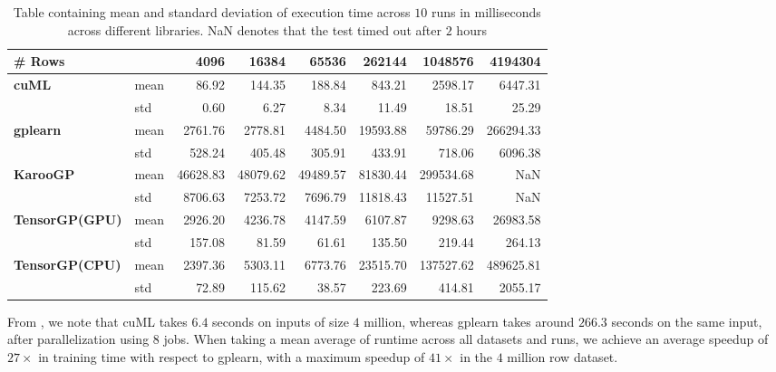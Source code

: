 \begin{table}[htbp]
  \caption{Table containing mean and standard deviation of execution time across $10$ runs in milliseconds across different libraries. NaN denotes that the test timed out after $2$ hours}
  \begin{adjustbox}{width=\columnwidth,center}
    \begin{tabular}{llrrrrrr}
      \toprule
      \textbf{\# Rows} & {} &  4096 & 16384 & 65536 & 262144 & 1048576 & 4194304 \\
      \midrule
      \textbf{cuML} & mean &    86.92 &   144.35 &   188.84 &    843.21 &    2598.17 &    6447.31 \\
      & std &     0.60 &     6.27 &     8.34 &     11.49 &      18.51 &      25.29 \\
      \midrule
      \textbf{gplearn} & mean &  2761.76 &  2778.81 &  4484.50 &  19593.88 &   59786.29 &  266294.33 \\
      & std &   528.24 &   405.48 &   305.91 &    433.91 &     718.06 &    6096.38 \\
      \midrule
      \textbf{KarooGP} & mean & 46628.83 & 48079.62 & 49489.57 &  81830.44 &  299534.68 &        NaN \\
      & std &  8706.63 &  7253.72 &  7696.79 &  11818.43 &   11527.51 &        NaN \\
      \midrule
      \textbf{TensorGP(GPU)} & mean &  2926.20 &  4236.78 &  4147.59 &   6107.87 &    9298.63 &   26983.58 \\
      & std &   157.08 &    81.59 &    61.61 &    135.50 &     219.44 &     264.13 \\
      \midrule
      \textbf{TensorGP(CPU)} & mean &  2397.36 &  5303.11 &  6773.76 &  23515.70 &  137527.62 &  489625.81 \\
      & std &    72.89 &   115.62 &    38.57 &    223.69 &     414.81 &    2055.17 \\
      \bottomrule
      \end{tabular}      
    \label{tab:execavgs}
  \end{adjustbox}
\end{table}

From , we note that cuML takes $6.4$ seconds on inputs of size $4$ million, whereas gplearn takes around $266.3$ seconds on the same input, after parallelization using $8$ jobs. When taking a mean average of runtime across all datasets and runs, we achieve an average speedup of $27\times$ in training time with respect to gplearn, with a maximum speedup of $41\times$ in the $4$ million row dataset.

